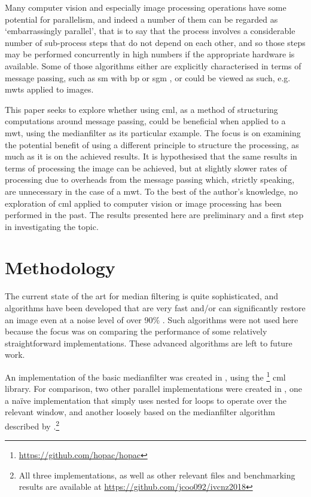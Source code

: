 Many computer vision and especially image processing operations have some potential for parallelism, and indeed a number of them can be regarded as `embarrassingly parallel', that is to say that the process involves a considerable number of sub-process steps that do not depend on each other, and so those steps may be performed concurrently in high numbers if the appropriate hardware is available.  Some of those algorithms either are explicitly characterised in terms of message passing, such as \gls{sm} with \gls{bp} \cite{Liang2011} or \gls{sgm} \cite{Drory2014}, or could be viewed as such, e.g. \glspl{mwt} applied to images.

This paper seeks to explore whether using \gls{cml}, as a method of structuring computations around message passing, could be beneficial when applied to a \gls{mwt}, using the \gls{medianfilter} as its particular example.  The focus is on examining the potential benefit of using a different principle to structure the processing, as much as it is on the achieved results.  It is hypothesised that the same results in terms of processing the image can be achieved, but at slightly slower rates of processing due to overheads from the message passing which, strictly speaking, are unnecessary in the case of a \gls{mwt}. To the best of the author's knowledge, no exploration of \gls{cml} applied to computer vision or image processing has been performed in the past.  The results presented here are preliminary and a first step in investigating the topic.

\section{Methodology}

The current state of the art for median filtering is quite sophisticated, and algorithms have been developed that are very fast \cite{Sanchez2012,Perrot2014} and/or can significantly restore an image even at a noise level of over 90\% \cite{Gao2015,Wu2011}.  Such algorithms were not used here because the focus was on comparing the performance of some relatively straightforward implementations.  These advanced algorithms are left to future work.

An implementation of the basic \gls{medianfilter} was created in \fsharp{}, using the \hopac{}\footnote{\url{https://github.com/hopac/hopac}} \gls{cml} library.  For comparison, two other parallel implementations were created in \fsharp{}, one a naïve implementation that simply uses nested for loops to operate over the relevant window, and another loosely based on the \gls{medianfilter} algorithm described by \citeauthor{Braunl2001} \cite{Braunl2001}.\footnote{All three implementations, as well as other relevant files and benchmarking results are available at \url{https://github.com/jcoo092/ivcnz2018}}

